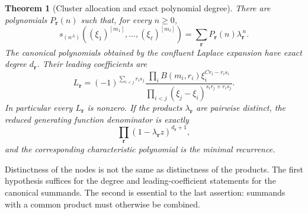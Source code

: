 \documentclass[11pt]{article}
\newtheorem{theorem}{Theorem}[section]
\theoremstyle{definition}
\theoremstyle{remark}
\newcommand{\rep}[2]{(#1)^{[#2]}}
\theoremstyle{definition}
\theoremstyle{plain}
\numberwithin{equation}{section}
\begin{document}
\begin{theorem}[Cluster allocation and exact polynomial degree]
\label{rs:thm:cluster}
There are polynomials $P_{\boldsymbol r}(n)$ such that, for every $n\ge0$,
\begin{equation}
 s_{(n^A)}(\rep{\xi_1}{m_1},\ldots,\rep{\xi_\ell}{m_\ell})
 =\sum_{\boldsymbol r}P_{\boldsymbol r}(n)\lambda_{\boldsymbol r}^{\,n}.
 \label{rs:eq:cluster-expansion}
\end{equation}
The canonical polynomials obtained by the confluent Laplace expansion have
exact degree $d_{\boldsymbol r}$. Their leading coefficients are
\begin{equation}
 \boxed{\displaystyle
 L_{\boldsymbol r}=
 (-1)^{\sum_{i<j}r_i s_j}
 \frac{\prod_i B(m_i,r_i)\xi_i^{C r_i-r_i s_i}}
 {\prod_{i<j}(\xi_j-\xi_i)^{s_i r_j+r_i s_j}}.}
 \label{rs:eq:LC}
\end{equation}
In particular every $L_{\boldsymbol r}$ is nonzero. If the products
$\lambda_{\boldsymbol r}$ are pairwise distinct, the reduced generating
function denominator is exactly
\begin{equation}
 \prod_{\boldsymbol r}(1-\lambda_{\boldsymbol r}z)^{d_{\boldsymbol r}+1},
 \label{rs:eq:cluster-denominator}
\end{equation}
and the corresponding characteristic polynomial is the minimal recurrence.
\end{theorem}

Distinctness of the nodes is not the same as distinctness of the products.
The first hypothesis suffices for the degree and leading-coefficient
statements for the canonical summands. The second is essential to the
last assertion: summands with a common product must otherwise be combined.
\end{document}
